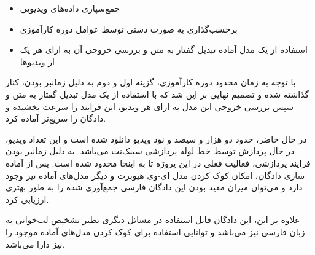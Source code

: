 \begin{itemize}
	\item جمع‌سپاری
	داده‌های ویدیویی
	\item برچسب‌گذاری به صورت دستی توسط عوامل دوره کارآموزی
	\item استفاده از یک مدل آماده تبدیل گفتار به متن
	و بررسی خروجی آن به ازای هر یک از ویدیو‌ها
\end{itemize}

با توجه به زمان محدود دوره کارآموزی، گزینه اول و دوم به دلیل زمانبر بودن، کنار گذاشته شده و تصمیم نهایی بر این شد که با استفاده از یک مدل تبدیل گفتار به متن و سپس بررسی خروجی این مدل به ازای هر ویدیو، این فرایند را سرعت بخشیده و دادگان را سریع‌تر آماده کرد.

در حال حاضر، حدود دو هزار و سیصد و نود ویدیو دانلود شده است و این تعداد ویدیو، در حال پردازش توسط خط لوله پردازشی سینک‌نت می‌باشد. به دلیل زمانبر بودن فرایند پردازشی، فعالیت فعلی در این پروژه تا به اینجا محدود شده است. پس از آماده سازی دادگان، امکان کوک کردن مدل ای-وی هیوبرت و دیگر مدل‌های آماده نیز وجود دارد و می‌توان میزان مفید بودن این دادگان فارسی جمع‌آوری شده را به طور بهتری ارزیابی کرد.

علاوه بر این، این دادگان قابل استفاده در مسائل دیگری نظیر تشخیص لب‌خوانی به زبان فارسی نیز می‌باشد و توانایی استفاده برای کوک کردن مدل‌های آماده موجود را نیز دارا می‌باشد.